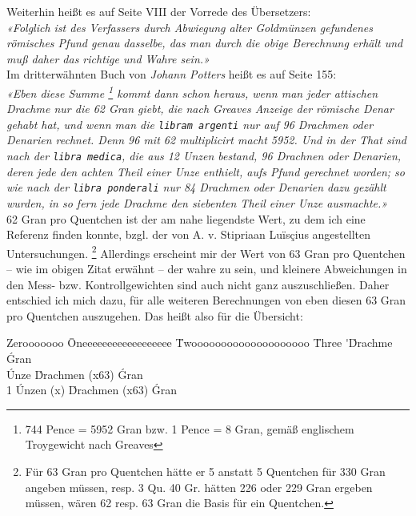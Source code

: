 \documentclass[a5paper,fontsize=10pt]{memoir}
\newcommand\ouncesofpound{12}
\newcommand\quentinsofounce{8}
\newcommand\gransofquentins{63}
\begin{document}
Weiterhin heißt es auf Seite VIII der Vorrede des Übersetzers:\\

\emph{«Folglich ist des Verfassers durch Abwiegung
alter Goldmünzen gefundenes römisches Pfund genau dasselbe,
das man durch die obige Berechnung erhält
und muß daher das richtige und Wahre sein.»}\\

Im dritterwähnten Buch von \emph{Johann Potters}
heißt es auf Seite 155:\\

\emph{«Eben diese Summe%
\footnote{744 Pence = 5952 Gran bzw. 1 Pence = 8 Gran,
gemäß englischem Troygewicht nach Greaves}
kommt dann schon heraus,
wenn man jeder attischen Drachme nur die 62 Gran giebt,
die nach Greaves Anzeige der römische Denar gehabt hat,
und wenn man die \texttt{libram argenti} nur auf 96 Drachmen
oder Denarien rechnet.
Denn 96 mit 62 multiplicirt macht 5952.
Und in der That sind nach der \texttt{libra medica},
die aus 12 Unzen bestand, 96 Drachnen oder Denarien,
deren jede den achten Theil einer Unze enthielt,
aufs Pfund gerechnet worden;
so wie nach der \texttt{libra ponderali} nur 84 Drachmen
oder Denarien dazu gezählt wurden,
in so fern jede Drachme den siebenten Theil einer Unze ausmachte.»}\\

62 Gran pro Quentchen
ist der am nahe liegendste Wert,
zu dem ich eine Referenz finden konnte,
bzgl. der von A. v. Stipriaan Luïsçius angestellten Untersuchungen.%
\footnote{Für 63 Gran pro Quentchen
hätte er 5 anstatt 5 Quentchen
für 330 Gran angeben müssen,
resp. 3 Qu. 40 Gr. hätten 226 oder 229 Gran ergeben müssen,
wären 62 resp. 63 Gran die Basis für ein Quentchen.}
Allerdings erscheint mir der Wert von 63 Gran pro Quentchen --
wie im obigen Zitat erwähnt --
der wahre zu sein,
und kleinere Abweichungen in den Mess- bzw. Kontrollgewichten
sind auch nicht ganz auszuschließen. Daher entschied ich mich dazu, für alle weiteren Berechnungen von eben diesen 63 Gran pro Quentchen auszugehen. Das heißt also für die Übersicht:\\

\noindent
\begin{minipage}{\linewidth}
\begin{tabbing}
Zerooooooo \= Oneeeeeeeeeeeeeeeeee \= Twoooooooooooooooooooo \= Three      \kill
           \>  \'                  \'Drachme             \>  \gransofquentins\'Gran \\
           \'Unze              \> \quentinsofounce\'Drachmen (x\gransofquentins)      \> \fpeval{\quentinsofounce * \gransofquentins}\'Gran \\
1 \Pfund   \>\ouncesofpound\'Unzen (x\fpeval{\quentinsofounce * \gransofquentins})      \>\fpeval{\ouncesofpound * \quentinsofounce}\'Drachmen (x\gransofquentins)      \>\fpeval{\ouncesofpound * \quentinsofounce * \gransofquentins}\'Gran \\
\end{tabbing}
\end{minipage}
\end{document}
